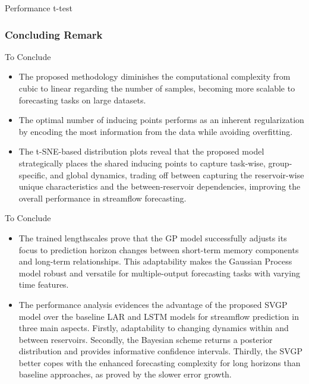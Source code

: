 \begin{frame}{Performance t-test}
\begin{table}[htbp]
	\end{table}
\end{frame}

\subsubsection{Concluding Remark}
\begin{frame}{To Conclude}
	\begin{itemize}
		\justifying
		\item The proposed methodology diminishes the computational complexity from cubic to linear regarding the number of samples, becoming more scalable to forecasting tasks on large datasets.
		\item The optimal number of inducing points performs as an inherent regularization by encoding the most information from the data while avoiding overfitting.
		\item The t-SNE-based distribution plots reveal that the proposed model strategically places the shared inducing points to capture task-wise, group-specific, and global dynamics, trading off between capturing the reservoir-wise unique characteristics and the between-reservoir dependencies, improving the overall performance in streamflow forecasting.
	\end{itemize}
	
\end{frame}

\begin{frame}{To Conclude}
	\begin{itemize}
		\justifying
		\item The trained lengthscales prove that the GP model successfully adjusts its focus to prediction horizon changes between short-term memory components and long-term relationships. This adaptability makes the Gaussian Process model robust and versatile for multiple-output forecasting tasks with varying time features.
		
		\item The performance analysis evidences the advantage of the proposed SVGP model over the baseline LAR and LSTM models for streamflow prediction in three main aspects. Firstly, adaptability to changing dynamics within and between reservoirs. Secondly, the Bayesian scheme returns a posterior distribution and provides informative confidence intervals. Thirdly, the SVGP better copes with the enhanced forecasting complexity for long horizons than baseline approaches, as proved by the slower error growth.
		
	\end{itemize}
	
\end{frame}
